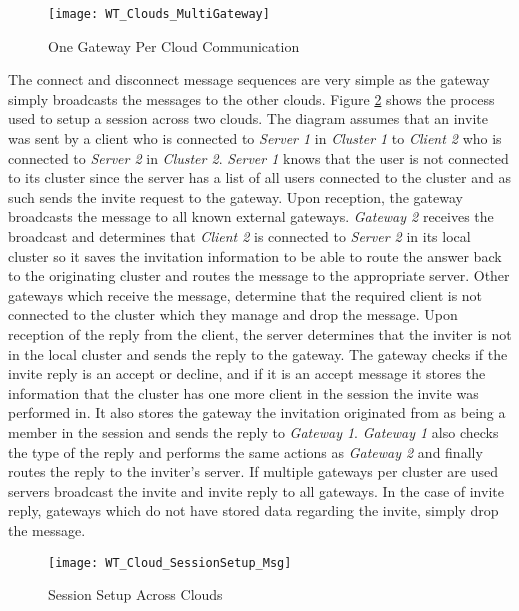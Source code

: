 \begin{figure}
	\centering
	\texttt{[image: WT\_Clouds\_MultiGateway]}
	\caption{One Gateway Per Cloud Communication}
	\label{fig:multigateway}
\end{figure}

The connect and disconnect message sequences are very simple as the gateway simply broadcasts the messages to the other clouds. Figure \ref{fig:cloudsesssetup} shows the process used to setup a session across two clouds. The diagram assumes that an invite was sent by a client who is connected to \textit{Server 1} in \textit{Cluster 1} to \textit{Client 2} who is connected to \textit{Server 2} in \textit{Cluster 2}. \textit{Server 1} knows that the user is not connected to its cluster since the server has a list of all users connected to the cluster and as such sends the invite request to the gateway. Upon reception, the gateway broadcasts the message to all known external gateways. \textit{Gateway 2} receives the broadcast and determines that \textit{Client 2} is connected to \textit{Server 2} in its local cluster so it saves the invitation information to be able to route the answer back to the originating cluster and routes the message to the appropriate server. Other gateways which receive the message, determine that the required client is not connected to the cluster which they manage and drop the message. Upon reception of the reply from the client, the server determines that the inviter is not in the local cluster and sends the reply to the gateway. The gateway checks if the invite reply is an accept or decline, and if it is an accept message it stores the information that the cluster has one more client in the session the invite was performed in. It also stores the gateway the invitation originated from as being a member in the session and sends the reply to \textit{Gateway 1}. \textit{Gateway 1} also checks the type of the reply and performs the same actions as \textit{Gateway 2} and finally routes the reply to the inviter's server. If multiple gateways per cluster are used servers broadcast the invite and invite reply to all gateways. In the case of invite reply, gateways which do not have stored data regarding the invite, simply drop the message.

\begin{figure}
	\centering
	\texttt{[image: WT\_Cloud\_SessionSetup\_Msg]}
	\caption{Session Setup Across Clouds}
	\label{fig:cloudsesssetup}
\end{figure}

